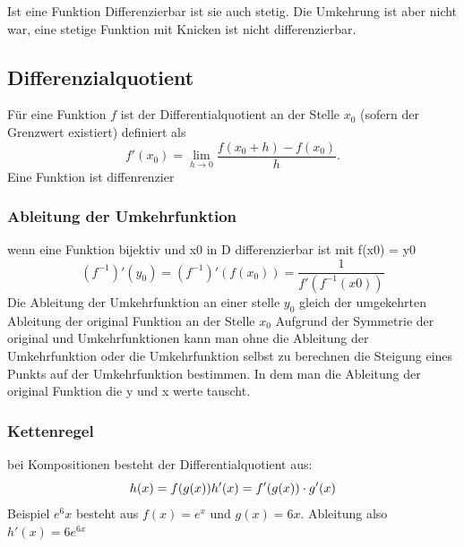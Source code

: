 \begin{theorem}
    Ist eine Funktion Differenzierbar ist sie auch stetig. Die Umkehrung ist aber nicht war, eine stetige Funktion mit Knicken ist nicht differenzierbar.
\end{theorem}

\subsection{Differenzialquotient}

\begin{definition}
    [Differentialquotient] Für eine Funktion $f$ ist der Differentialquotient an der Stelle $x_0$ (sofern der Grenzwert existiert) definiert als
    \[
        f'(x_0) = \lim_{h \to 0} \frac{f(x_0+h)-f(x_0)}{h}.
    \]
    Eine Funktion ist diffenrenzier
\end{definition}

\subsubsection{Ableitung der Umkehrfunktion}
\begin{theorem}
     wenn eine Funktion bijektiv und x0 in D differenzierbar ist mit f(x0) = y0
    \[
        (f^{-1})'(y_0) = (f^{-1})'(f(x_0)) = \frac{1}{f'(f^{-1}(x0))}
        \]
    Die Ableitung der Umkehrfunktion an einer stelle $y_0$ gleich der umgekehrten Ableitung der original Funktion an der Stelle $x_0$ 
        Aufgrund der Symmetrie der original und Umkehrfunktionen kann man ohne die Ableitung der Umkehrfunktion oder die Umkehrfunktion selbst zu berechnen die Steigung eines Punkts auf der Umkehrfunktion bestimmen. In dem man die Ableitung der original Funktion die y und x werte tauscht.
\end{theorem}

\subsubsection{Kettenregel}

\begin{theorem}
    [Kettenregel] bei Kompositionen besteht der Differentialquotient aus:
    \[
        h(x) = f(g(x)) \\ 
        h'(x) = f'(g(x)) \cdot g'(x)
    \]
    Beispiel $e^6x$ besteht aus $f(x) = e^x$ und $g(x) = 6x$. Ableitung also $h'(x) = 6e^{6x}$
\end{theorem}

